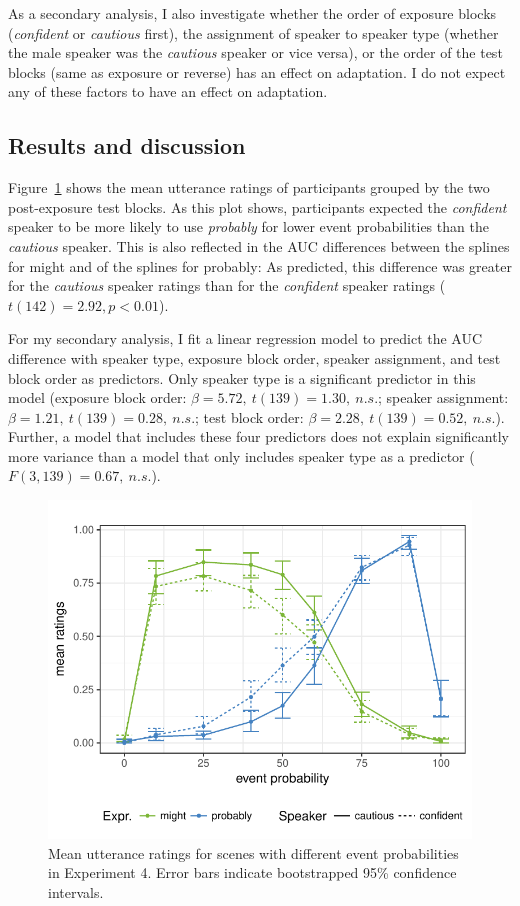 As a secondary analysis, I also investigate whether the order of exposure blocks 
(\textit{confident} or \textit{cautious} first), the assignment of speaker to speaker type 
(whether the male speaker was the \textit{cautious} speaker or vice versa), or the order 
of the test blocks (same as exposure or reverse) has an effect on adaptation. 
I do not expect any of these factors to have an effect on adaptation.



\subsection{Results and discussion}

Figure~\ref{fig:exp1-results} shows the mean utterance ratings of participants grouped by the two post-exposure test blocks. 
As this plot shows, participants expected the \textit{confident} speaker to be more likely to use \textit{probably} for lower 
event probabilities than the \textit{cautious} speaker. This is also reflected in the AUC differences between the splines for 
{\sc might} and of the splines for {\sc probably}: As predicted, this difference was greater for the  \emph{cautious }speaker 
ratings than for the \emph{confident} speaker ratings ($t(142)=2.92, p < 0.01$).

For my secondary analysis, I fit a linear regression model to predict the AUC difference with speaker type, exposure block order, speaker assignment, and test block order as predictors. Only speaker type is a significant predictor in this model (exposure block order: $\beta=5.72, \ t(139)=1.30, \ n.s.$; speaker assignment: $\beta=1.21, \ t(139)=0.28, \ n.s.$; test block order:  $\beta=2.28, \ t(139)=0.52, \ n.s.$). Further, a model that includes these four predictors does not explain significantly more variance than a model that only includes speaker type as a predictor ($F(3,139)=0.67, \  n.s.$).

\begin{figure}
\center
\includegraphics[width=0.5\columnwidth]{plots/exp1-results.pdf}
\caption{Mean utterance ratings for scenes with different event probabilities in Experiment 4. Error bars indicate bootstrapped 95\% confidence intervals. \label{fig:exp1-results}}
\end{figure}


